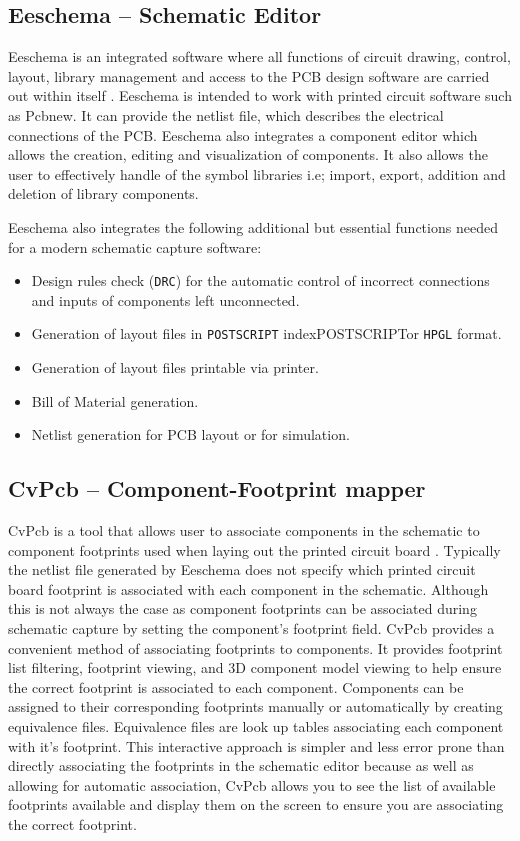 \subsection {Eeschema -- Schematic Editor}
Eeschema is an integrated software where all functions of circuit drawing, control, layout, library management and access to the PCB design software are carried out within itself \cite{eeschema}. Eeschema is intended to work with printed circuit software such as Pcbnew. It can provide the netlist file, which describes the electrical connections of the PCB. Eeschema also integrates a component editor which allows the creation, editing and visualization of components. It also allows the user to effectively handle of the symbol libraries i.e; import, export, addition and deletion of library components.

Eeschema also integrates the following additional but essential functions needed for a modern schematic capture software:
\begin{itemize}
\item Design rules check  ({\tt DRC}) for the automatic control of incorrect connections and inputs of components left unconnected.
\item Generation of layout files in {\tt POSTSCRIPT} index{POSTSCRIPT}or {\tt HPGL}  format.
\item Generation of layout files printable via printer.
\item Bill of Material generation.
\item Netlist generation for PCB layout or for simulation.
\end{itemize}

\subsection {CvPcb -- Component-Footprint mapper}
CvPcb is a tool that allows user to associate components in the schematic to component footprints used when laying out the printed circuit board \cite{eeschema}. Typically the netlist file generated by Eeschema does not specify which printed circuit board footprint is associated with each component in the schematic. Although this is not always the case as component footprints can be associated during schematic capture by setting the component's footprint field. CvPcb provides a convenient method of associating footprints to components. It provides footprint list filtering, footprint viewing, and 3D component model viewing to help ensure the correct footprint is associated to each component. Components can be assigned to their corresponding footprints manually or automatically by creating equivalence files. Equivalence files are look up tables associating each component with it's footprint. This interactive approach is simpler and less error prone than directly associating the footprints in the schematic editor because as well as allowing for automatic association, CvPcb allows you to see the list of available footprints available and display them on the screen to ensure you are associating the correct footprint.

